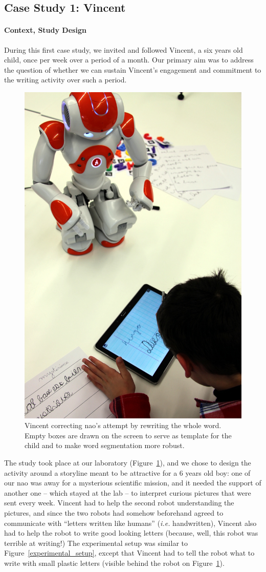 \documentclass{article}
\newcommand{\ie}{\textit{i.e.}\xspace}
\begin{document}
\subsection{Case Study 1: Vincent}

\paragraph{Context, Study Design}

During this first case study, we invited and followed Vincent, a six years old
child, once per week over a period of a month. Our primary aim was to address the
question of whether we can sustain Vincent's engagement and commitment to the
writing activity over such a period.

\begin{figure}
    \centering
    \includegraphics[width=0.5\linewidth]{diego}
    \caption{\small Vincent correcting {\sc nao}'s attempt by rewriting the
        whole word. Empty boxes are drawn on the screen to serve as template for the child
        and to make word segmentation more robust.}
    \label{fig:diego}
\end{figure}

The study took place at our laboratory (Figure~\ref{fig:diego}), and we chose to
design the activity around a storyline meant to be attractive for a 6 years old
boy: one of our {\sc nao} was away for a mysterious scientific mission, and it
needed the support of another one -- which stayed at the lab -- to interpret
curious pictures that were sent every week. Vincent had to help the second robot
understanding the pictures, and since the two robots had somehow beforehand
agreed to communicate with ``letters written like humans'' (\ie handwritten),
Vincent also had to help the robot to write good looking letters (because, well,
this robot was terrible at writing!) The experimental setup was similar to
Figure~\ref{experimental_setup}, except that Vincent had to tell the robot what
to write with small plastic letters (visible behind the robot on Figure~\ref{fig:diego}).
\end{document}

